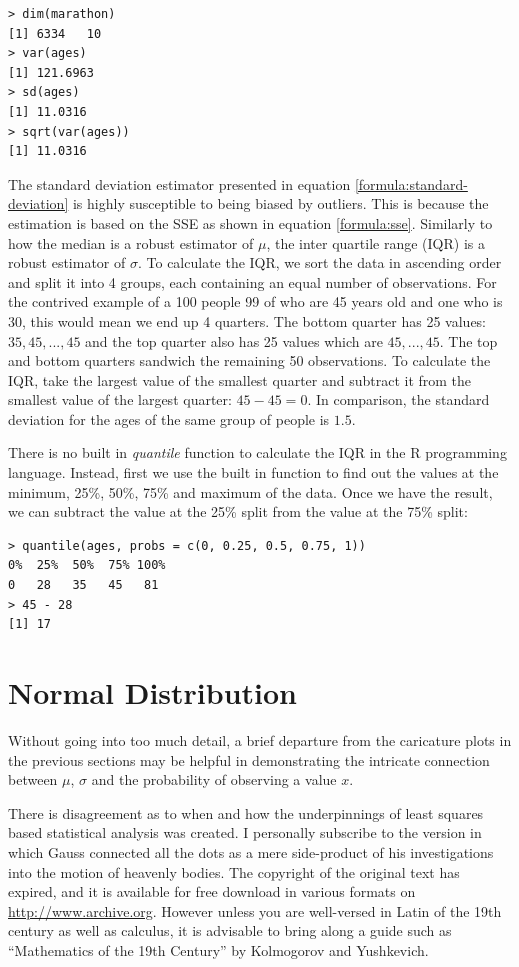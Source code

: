 \documentclass{tufte-book} %
\begin{document}
\begin{Verbatim}
> dim(marathon)
[1] 6334   10
> var(ages)
[1] 121.6963
> sd(ages)
[1] 11.0316
> sqrt(var(ages))
[1] 11.0316
\end{Verbatim}

The standard deviation estimator presented in equation \ref{formula:standard-deviation} is highly susceptible to being biased by outliers. This is because the estimation is based on the SSE as shown in equation \ref{formula:sse}. Similarly to how the median is a robust estimator of $\mu$, the inter quartile range (IQR) is a robust estimator of $\sigma$. To calculate the IQR, we sort the data in ascending order and split it into 4 groups, each containing an equal number of observations. For the contrived example of a 100 people 99 of who are 45 years old and one who is 30, this would mean we end up 4 quarters. The bottom quarter has 25 values: $35, 45, ..., 45$ and the top quarter also has 25 values which are $45,...,45$. The top and bottom quarters sandwich the remaining 50 observations. To calculate the IQR, take the largest value of the smallest quarter and subtract it from the smallest value of the largest quarter: $45 - 45 = 0$. In comparison, the standard deviation for the ages of the same group of people is $1.5$.

There is no built in {\em quantile} function to calculate the IQR in the R programming language. Instead, first we use the built in function to find out the values at the minimum, 25\%, 50\%, 75\% and maximum of the data. Once we have the result, we can subtract the value at the 25\% split from the value at the 75\% split:

\begin{Verbatim}
> quantile(ages, probs = c(0, 0.25, 0.5, 0.75, 1))
0%  25%  50%  75% 100% 
0   28   35   45   81 
> 45 - 28
[1] 17
\end{Verbatim}

\section{Normal Distribution}
Without going into too much detail, a brief departure from the caricature plots in the previous sections may be helpful in demonstrating the intricate connection between $\mu$, $\sigma$ and the probability of observing a value $x$. 

There is disagreement as to when and how the underpinnings of least squares based statistical analysis was created. I personally subscribe to the version in which Gauss connected all the dots as a mere side-product of his investigations into the motion of heavenly bodies\cite{gauss1877}. The copyright of the original text has expired, and it is available for free download in various formats on \url{http://www.archive.org}. However unless you are well-versed in Latin of the 19th century as well as calculus, it is advisable to bring along a guide such as ``Mathematics of the 19th Century'' by Kolmogorov and Yushkevich\cite{kolmogorov1992}. 
\end{document}
